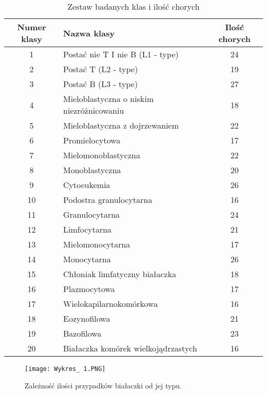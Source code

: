 \documentclass{article}
\begin{document}
\begin{center}
	\begin{longtable}{ |c|p{7cm}|c| } 
	\caption{Zestaw badanych klas i ilość chorych}
		\label{tab:tabela_klas}\\
		\hline
			Numer klasy & Nazwa klasy & Ilość chorych \\
		\hline
			1 & Postać nie T I nie B (L1 - type) & 24 \\
		\hline	
			2 & Postać T (L2 - type) & 19 \\
		\hline	
			3 & Postać B (L3 - type) & 27 \\
		\hline
			4 & Mieloblastyczna o niskim niezróżnicowaniu & 18 \\
		\hline	
			5 & Mieloblastyczna z dojrzewaniem & 22 \\
		\hline	
			6 & Promielocytowa & 17 \\
		\hline	
			7 & Mielomonoblastyczna & 22 \\
		\hline	
			8 & Monoblastyczna & 20 \\
		\hline	
			9 & Cytoeukemia & 26 \\
		\hline	
			10 & Podostra granulocytarna & 16 \\
		\hline	
			11 & Granulocytarna & 24 \\
		\hline	
			12 & Limfocytarna & 21 \\
		\hline	
			13 & Mielomonocytarna & 17 \\
		\hline	
			14 & Monocytarna & 26 \\
		\hline	
			15 & Chłoniak limfatyczny białaczka  & 18 \\
		\hline	
			16 & Plazmocytowa & 17 \\
		\hline	
			17 & Wielokapilarnokomórkowa & 16 \\
		\hline	
			18 & Eozynofilowa & 21 \\
		\hline	
			19 & Bazofilowa & 23 \\
		\hline	
			20 & Białaczka komórek wielkojądrzastych  & 16 \\
		\hline
		
	\end{longtable}
\end{center}

\begin{figure}[ht]
    \centering
    \noindent 
    \vspace{.2cm}
    \texttt{[image: Wykres\_ 1.PNG]}
    \caption{Zależność ilości przypadków białaczki od jej typu.}
    \label{fig:klasy}
\end{figure}
\newpage
\end{document}
